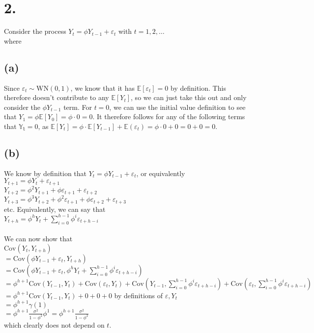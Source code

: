 \documentclass{article}
\begin{document}
\section*{2.}
{\Large

Consider the process $Y_t = \phi Y_{t-1} + \varepsilon_t$ with $t = 1, 2, \dots$ \\
where 

\subsection*{(a)}

Since $\varepsilon_t \sim \text{WN}(0,1)$, we know that it has $\mathbb{E}[\varepsilon_t] = 0$ by definition. This therefore doesn't contribute to any $\mathbb{E}[Y_t]$, so we can just take this out and only consider the $\phi Y_{t-1}$ term. For $t = 0$, we can use the initial value definition to see that $Y_1 = \phi \mathbb{E}[Y_0] = \phi \cdot 0 = 0$. It therefore follows for any of the following terms that $\mathbb{Y_t} = 0$, as $\mathbb{E}[Y_t] = \phi \cdot \mathbb{E}[Y_{t-1}] + \mathbb{E}(\varepsilon_t) = \phi \cdot 0 + 0 = 0 + 0 = 0$.

\subsection*{(b)}

We know by definition that $Y_t = \phi Y_{t-1} + \varepsilon_t$, or equivalently \\
$Y_{t+1} = \phi Y_t + \varepsilon_{t+1}$ \\
$Y_{t+2} = \phi^2 Y_{t+1} + \phi\varepsilon_{t+1} + \varepsilon_{t+2}$ \\ 
$Y_{t+3} = \phi^3 Y_{t+2} + \phi^2\varepsilon_{t+1} + \phi\varepsilon_{t+2} + \varepsilon_{t+3}$ \\ 
etc. Equivalently, we can say that \\ $Y_{t+h} = \phi^h Y_{t} + \sum_{i=0}^{h-1} \phi^i\varepsilon_{t+h-i}$ \\ \\
We can now show that \\
$\text{Cov}(Y_t, Y_{t+h})$ \\
$ = \text{Cov}(\phi Y_{t-1} + \varepsilon_t, Y_{t+h})$ \\
$ = \text{Cov}(\phi Y_{t-1} + \varepsilon_t, \phi^h Y_{t} + \sum_{i=0}^{h-1} \phi^i\varepsilon_{t+h-i})$ \\
$ = \phi^{h+1}\text{Cov}(Y_{t-1}, Y_{t}) + \text{Cov}(\varepsilon_t, Y_{t}) + \text{Cov}(Y_{t-1}, \sum_{i=0}^{h-1} \phi^i\varepsilon_{t+h-i}) + \text{Cov}(\varepsilon_t, \sum_{i=0}^{h-1} \phi^i\varepsilon_{t+h-i})$ \\
$ = \phi^{h+1}\text{Cov}(Y_{t-1}, Y_{t}) + 0 + 0 + 0$ \hfill by definitions of $\varepsilon, Y_t$ \\ 
$= \phi^{h+1} \gamma(1)$ \\
$= \phi^{h+1} \frac{\sigma^2}{1-\phi^2}\phi^1 = \phi^{h+1} \frac{\sigma^2}{1-\phi^2}$ \\ 
which clearly does not depend on $t$.

}
\end{document}

